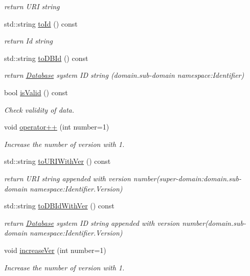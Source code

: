\begin{DoxyCompactItemize}
\begin{DoxyCompactList}\small\item\em return U\-R\-I string \end{DoxyCompactList}\item 
std\-::string \hyperlink{classunisys_1_1Miriam_ad44b570433a4e5ec797a6299b2546dc4}{to\-Id} () const 
\begin{DoxyCompactList}\small\item\em return Id string \end{DoxyCompactList}\item 
std\-::string \hyperlink{classunisys_1_1Miriam_a8ae73a002b63b953f75240ffbbfabd31}{to\-D\-B\-Id} () const 
\begin{DoxyCompactList}\small\item\em return \hyperlink{classunisys_1_1Database}{Database} system I\-D string (domain.\-sub-\/domain namespace\-:Identifier) \end{DoxyCompactList}\item 
bool \hyperlink{classunisys_1_1Miriam_a853dadae3c31160585e0cc0482825305}{is\-Valid} () const 
\begin{DoxyCompactList}\small\item\em Check validity of data. \end{DoxyCompactList}\item 
void \hyperlink{classunisys_1_1Miriam_acc3826ec210a5b031a070eb95e9caa7a}{operator++} (int number=1)
\begin{DoxyCompactList}\small\item\em Increase the number of version with 1. \end{DoxyCompactList}\item 
std\-::string \hyperlink{classunisys_1_1Miriam_a3af5a3b8f029f0ac520ed2f9e277d06e}{to\-U\-R\-I\-With\-Ver} () const 
\begin{DoxyCompactList}\small\item\em return U\-R\-I string appended with version number(super-\/domain\-:domain.\-sub-\/domain namespace\-:Identifier.\-Version) \end{DoxyCompactList}\item 
std\-::string \hyperlink{classunisys_1_1Miriam_a28dcd3c0e6dbba1ae13cada7bb9fcb64}{to\-D\-B\-Id\-With\-Ver} () const 
\begin{DoxyCompactList}\small\item\em return \hyperlink{classunisys_1_1Database}{Database} system I\-D string appended with version number(domain.\-sub-\/domain namespace\-:Identifier.\-Version) \end{DoxyCompactList}\item 
void \hyperlink{classunisys_1_1Miriam_a1edce6273cd71ec7289016008ffe9c67}{increase\-Ver} (int number=1)
\begin{DoxyCompactList}\small\item\em Increase the number of version with 1. \end{DoxyCompactList}\end{DoxyCompactItemize}
